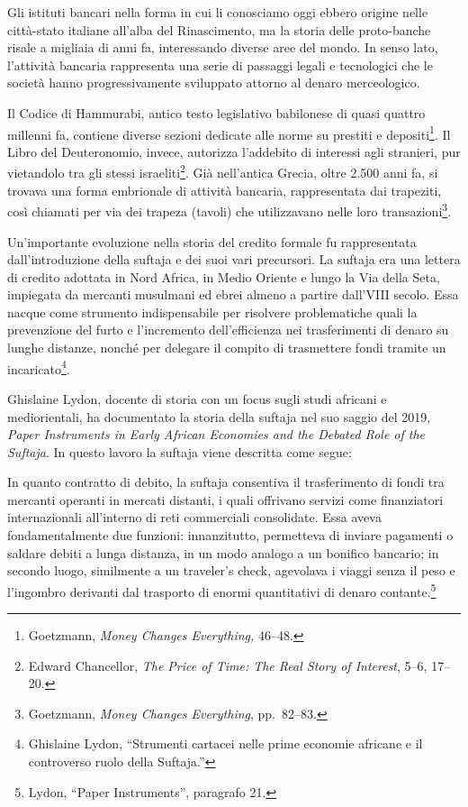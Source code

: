 \documentclass[
  a5paper,
  smalldemyvopaper,10pt,twoside,onecolumn,openright,extrafontsizes,hidelinks]{memoir}
\begin{document}
Gli istituti bancari nella forma in cui li conosciamo oggi ebbero
origine nelle città-stato italiane all'alba del Rinascimento, ma la
storia delle proto-banche risale a migliaia di anni fa, interessando
diverse aree del mondo. In senso lato, l'attività bancaria rappresenta
una serie di passaggi legali e tecnologici che le società hanno
progressivamente sviluppato attorno al denaro merceologico.

Il Codice di Hammurabi, antico testo legislativo babilonese di quasi
quattro millenni fa, contiene diverse sezioni dedicate alle norme su
prestiti e depositi\footnote{Goetzmann, \emph{Money Changes Everything,}
  46--48.}. Il Libro del Deuteronomio, invece, autorizza l'addebito di
interessi agli stranieri, pur vietandolo tra gli stessi
israeliti\footnote{Edward Chancellor, \emph{The Price of Time: The Real
  Story of Interest}, 5--6, 17--20.}. Già nell'antica Grecia, oltre
2.500 anni fa, si trovava una forma embrionale di attività bancaria,
rappresentata dai trapeziti, così chiamati per via dei trapeza (tavoli)
che utilizzavano nelle loro transazioni\footnote{Goetzmann, \emph{Money
  Changes Everything}, pp.~82--83.}.

Un'importante evoluzione nella storia del credito formale fu
rappresentata dall'introduzione della suftaja e dei suoi vari
precursori. La suftaja era una lettera di credito adottata in Nord
Africa, in Medio Oriente e lungo la Via della Seta, impiegata da
mercanti musulmani ed ebrei almeno a partire dall'VIII secolo. Essa
nacque come strumento indispensabile per risolvere problematiche quali
la prevenzione del furto e l'incremento dell'efficienza nei
trasferimenti di denaro su lunghe distanze, nonché per delegare il
compito di trasmettere fondi tramite un incaricato\footnote{Ghislaine
  Lydon, ``Strumenti cartacei nelle prime economie africane e il
  controverso ruolo della Suftaja.''}.

Ghislaine Lydon, docente di storia con un focus sugli studi africani e
mediorientali, ha documentato la storia della suftaja nel suo saggio del
2019, \emph{Paper Instruments in Early African Economies and the Debated
Role of the Suftaja}. In questo lavoro la suftaja viene descritta come
segue:

In quanto contratto di debito, la suftaja consentiva il trasferimento di
fondi tra mercanti operanti in mercati distanti, i quali offrivano
servizi come finanziatori internazionali all'interno di reti commerciali
consolidate. Essa aveva fondamentalmente due funzioni: innanzitutto,
permetteva di inviare pagamenti o saldare debiti a lunga distanza, in un
modo analogo a un bonifico bancario; in secondo luogo, similmente a un
traveler's check, agevolava i viaggi senza il peso e l'ingombro
derivanti dal trasporto di enormi quantitativi di denaro
contante.\footnote{Lydon, ``Paper Instruments'', paragrafo 21.}
\end{document}
